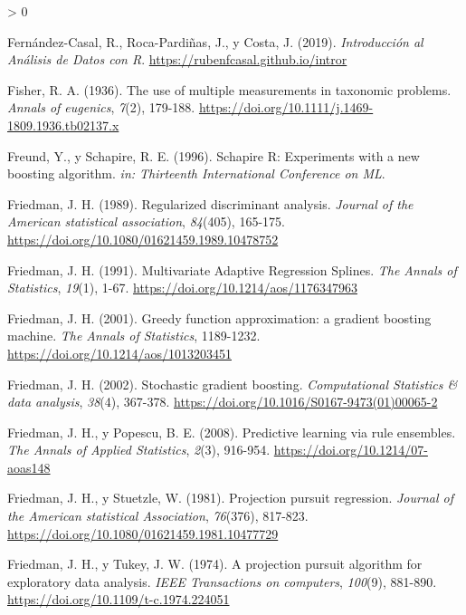 \documentclass[
  spanish,
]{book}
\theoremstyle{break}
\newlength{\cslhangindent}
\newenvironment{CSLReferences}[2] %
 {%
  \setlength{\parindent}{0pt}
  \ifodd #1 \everypar{\setlength{\hangindent}{\cslhangindent}}\ignorespaces\fi
  \ifnum #2 > 0
  \setlength{\parskip}{#2\baselineskip}
  \fi
 }%
 {}
\theoremstyle{definition}
\theoremstyle{definition}
\theoremstyle{definition}
\theoremstyle{definition}
\theoremstyle{remark}
\begin{document}
\begin{CSLReferences}{1}{0}
\leavevmode\hypertarget{ref-fernandez2019intror}{}%
Fernández-Casal, R., Roca-Pardiñas, J., y Costa, J. (2019). \emph{Introducción al Análisis de Datos con R}. \url{https://rubenfcasal.github.io/intror}

\leavevmode\hypertarget{ref-fisher1936use}{}%
Fisher, R. A. (1936). The use of multiple measurements in taxonomic problems. \emph{Annals of eugenics}, \emph{7}(2), 179-188. \url{https://doi.org/10.1111/j.1469-1809.1936.tb02137.x}

\leavevmode\hypertarget{ref-freund1996schapire}{}%
Freund, Y., y Schapire, R. E. (1996). Schapire R: Experiments with a new boosting algorithm. \emph{in: Thirteenth International Conference on ML}.

\leavevmode\hypertarget{ref-friedman1989regularized}{}%
Friedman, J. H. (1989). Regularized discriminant analysis. \emph{Journal of the American statistical association}, \emph{84}(405), 165-175. \url{https://doi.org/10.1080/01621459.1989.10478752}

\leavevmode\hypertarget{ref-friedman1991multivariate}{}%
Friedman, J. H. (1991). {Multivariate Adaptive Regression Splines}. \emph{The Annals of Statistics}, \emph{19}(1), 1-67. \url{https://doi.org/10.1214/aos/1176347963}

\leavevmode\hypertarget{ref-friedman2001greedy}{}%
Friedman, J. H. (2001). Greedy function approximation: a gradient boosting machine. \emph{The Annals of Statistics}, 1189-1232. \url{https://doi.org/10.1214/aos/1013203451}

\leavevmode\hypertarget{ref-friedman2002stochastic}{}%
Friedman, J. H. (2002). Stochastic gradient boosting. \emph{Computational Statistics \& data analysis}, \emph{38}(4), 367-378. \url{https://doi.org/10.1016/S0167-9473(01)00065-2}

\leavevmode\hypertarget{ref-friedman2008predictive}{}%
Friedman, J. H., y Popescu, B. E. (2008). Predictive learning via rule ensembles. \emph{The Annals of Applied Statistics}, \emph{2}(3), 916-954. \url{https://doi.org/10.1214/07-aoas148}

\leavevmode\hypertarget{ref-friedman1981projection}{}%
Friedman, J. H., y Stuetzle, W. (1981). Projection pursuit regression. \emph{Journal of the American statistical Association}, \emph{76}(376), 817-823. \url{https://doi.org/10.1080/01621459.1981.10477729}

\leavevmode\hypertarget{ref-friedman1974projection}{}%
Friedman, J. H., y Tukey, J. W. (1974). A projection pursuit algorithm for exploratory data analysis. \emph{IEEE Transactions on computers}, \emph{100}(9), 881-890. \url{https://doi.org/10.1109/t-c.1974.224051}


\end{CSLReferences}
\end{document}
